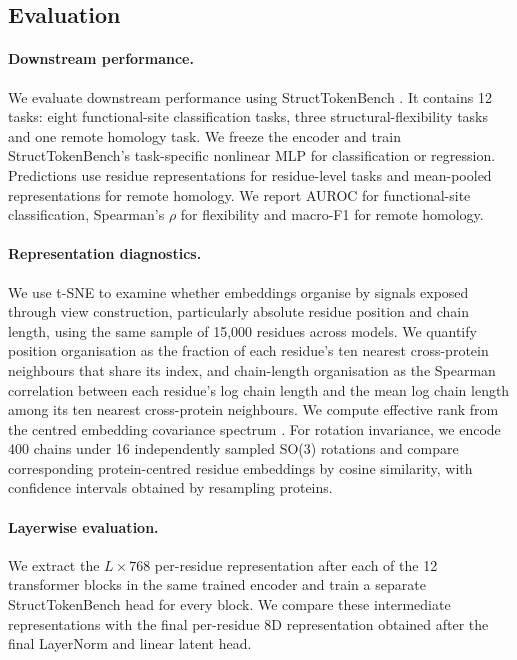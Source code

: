 \documentclass{article}
\begin{document}
\subsection{Evaluation}
\label{sec:evaluation}

\paragraph{Downstream performance.}
We evaluate downstream performance using StructTokenBench \citep{yuan2025protein}. It contains 12 tasks: eight functional-site classification tasks, three structural-flexibility tasks and one remote homology task. We freeze the encoder and train StructTokenBench's task-specific nonlinear MLP for classification or regression. Predictions use residue representations for residue-level tasks and mean-pooled representations for remote homology. We report AUROC for functional-site classification, Spearman's $\rho$ for flexibility and macro-F1 for remote homology.

\paragraph{Representation diagnostics.}
We use t-SNE to examine whether embeddings organise by signals exposed through view construction, particularly absolute residue position and chain length, using the same sample of 15{,}000 residues across models. We quantify position organisation as the fraction of each residue's ten nearest cross-protein neighbours that share its index, and chain-length organisation as the Spearman correlation between each residue's log chain length and the mean log chain length among its ten nearest cross-protein neighbours. We compute effective rank from the centred embedding covariance spectrum \citep{roy2007effective}. For rotation invariance, we encode 400 chains under 16 independently sampled SO(3) rotations and compare corresponding protein-centred residue embeddings by cosine similarity, with confidence intervals obtained by resampling proteins.

\paragraph{Layerwise evaluation.}
We extract the $L\times768$ per-residue representation after each of the 12 transformer blocks in the same trained encoder and train a separate StructTokenBench head for every block. We compare these intermediate representations with the final per-residue 8D representation obtained after the final LayerNorm and linear latent head.
\end{document}
